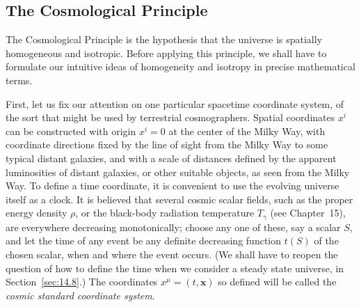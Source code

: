 %

\subsection{The Cosmological Principle}\label{sec:14.1}

The Cosmological Principle is the hypothesis that the universe is spatially
homogeneous and isotropic. Before applying this principle, we shall have to
formulate our intuitive ideas of homogeneity and isotropy in precise
mathematical terms.

First, let us fix our attention on one particular spacetime coordinate system,
of the sort that might be used by terrestrial cosmographers. Spatial
coordinates \(x^i\) can be constructed with origin \(x^i=0\) at the center of
the Milky Way, with coordinate directions fixed by the line of sight from the
Milky Way to some typical distant galaxies, and with a scale of distances
defined by the apparent luminosities of distant galaxies, or other suitable
objects, as seen from the Milky Way. To define a time coordinate, it is
convenient to use the evolving universe itself as a clock. It is believed that
several cosmic scalar fields, such as the proper energy density \(\rho\), or
the black-body radiation temperature \(T_\gamma\) (see Chapter~15), are
everywhere decreasing monotonically; choose any one of these, say a scalar
\(S\), and let the time of any event be any definite decreasing function
\(t(S)\) of the chosen scalar, when and where the event occurs. (We shall have
to reopen the question of how to define the time when we consider a steady
state universe, in Section~\ref{sec:14.8}.) The coordinates
\(x^\mu=(t,\mathbf{x})\) so defined will be called the \emph{cosmic standard
coordinate system}.

